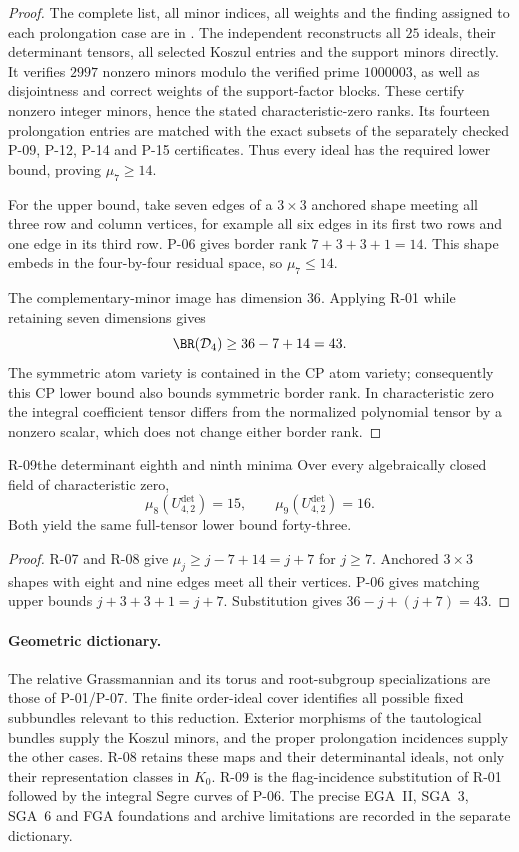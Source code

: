 \begin{proof}
The complete list, all minor indices, all weights and the
finding assigned to each prolongation case are in
.
The independent  reconstructs
all $25$ ideals, their determinant tensors, all selected
Koszul entries and the support minors directly. It verifies
$2997$ nonzero minors modulo the verified prime $1000003$,
as well as disjointness and correct weights of the support-factor
blocks. These certify nonzero integer minors, hence the stated
characteristic-zero ranks. Its fourteen prolongation entries
are matched with the exact subsets of the separately checked
P-09, P-12, P-14 and P-15 certificates. Thus every ideal has
the required lower bound, proving $\mu_7\geq14$.

For the upper bound, take seven edges of a $3\times3$
anchored shape meeting all three row and column vertices,
for example all six edges in its first two rows and one
edge in its third row. P-06 gives border rank
$7+3+3+1=14$. This shape embeds in the four-by-four residual
space, so $\mu_7\leq14$.

The complementary-minor image has dimension $36$.
Applying R-01 while retaining seven dimensions gives
\[
 \BR(\mathcal D_4)\geq36-7+14=43.
\]
The symmetric atom variety is contained in the CP atom
variety; consequently this CP lower bound also bounds
symmetric border rank. In characteristic zero the integral
coefficient tensor differs from the normalized polynomial
tensor by a nonzero scalar, which does not change either
border rank.
\end{proof}

\begin{finding}{R-09}{the determinant eighth and ninth minima}
Over every algebraically closed field of characteristic zero,
\[
 \mu_8(U^{\det}_{4,2})=15,\qquad
 \mu_9(U^{\det}_{4,2})=16.
\]
Both yield the same full-tensor lower bound forty-three.
\end{finding}
\begin{proof}
R-07 and R-08 give $\mu_j\geq j-7+14=j+7$ for $j\geq7$.
Anchored $3\times3$ shapes with eight and nine edges meet
all their vertices. P-06 gives matching upper bounds
$j+3+3+1=j+7$. Substitution gives $36-j+(j+7)=43$.
\end{proof}

\paragraph{Geometric dictionary.}
The relative Grassmannian and its torus and root-subgroup
specializations are those of P-01/P-07. The finite order-ideal
cover identifies all possible fixed subbundles relevant to
this reduction. Exterior morphisms of the tautological
bundles supply the Koszul minors, and the proper prolongation
incidences supply the other cases. R-08 retains these maps
and their determinantal ideals, not only their representation
classes in $K_0$. R-09 is the flag-incidence substitution
of R-01 followed by the integral Segre curves of P-06.
The precise EGA~II, SGA~3, SGA~6 and FGA foundations and
archive limitations are recorded in the separate dictionary.
